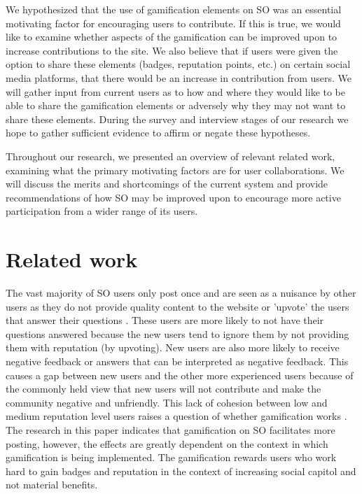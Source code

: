 \documentclass{sigchi}
\begin{document}
We hypothesized that the use of gamification elements on SO was an essential motivating factor for encouraging users to contribute. If this is true, we would like to examine whether aspects of the gamification can be improved upon to increase contributions to the site. We also believe that if users were given the option to share these elements (badges, reputation points, etc.) on certain social media platforms, that there would be an increase in contribution from users. We will gather input from current users as to how and where they would like to be able to share the gamification elements or adversely why they may not want to share these elements. During the survey and interview stages of our research we hope to gather sufficient evidence to affirm or negate these hypotheses.

Throughout our research, we presented an overview of relevant related work, examining what the primary motivating factors are for user collaborations. We will discuss the merits and shortcomings of the current system and provide recommendations of how SO may be improved upon to encourage more active participation from a wider range of its users.


\section{Related work}

The vast majority of SO users only post once and are seen as a nuisance by other users as they do not provide quality content to the website or 'upvote' the users that answer their questions \cite{Slag}. These users are more likely to not have their questions answered because the new users tend to ignore them by not providing them with reputation (by upvoting). New users are also more likely to receive negative feedback or answers that can be interpreted as negative feedback. This causes a gap between new users and the other more experienced users because of the commonly held view that new users will not contribute and make the community negative and unfriendly. This lack of cohesion between low and medium reputation level users raises a question of whether gamification works \cite{Hamari}. The research in this paper indicates that gamification on SO facilitates more posting, however, the effects are greatly dependent on the context in which gamification is being implemented. The gamification rewards users who work hard to gain badges and reputation in the context of increasing social capitol and not material benefits.
\end{document}

